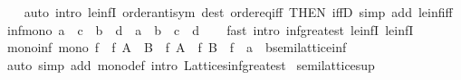 \begin{isabellebody}
%
\isadelimproof
\ \ %
\endisadelimproof
%
\isatagproof
{}\isamarkupfalse%
\ {\isacharparenleft}{\kern0pt}auto\ intro{\isacharcolon}{\kern0pt}\ le{\isacharunderscore}{\kern0pt}infI{}\ order{\isachardot}{\kern0pt}antisym\ dest{\isacharcolon}{\kern0pt}\ order{\isachardot}{\kern0pt}eq{\isacharunderscore}{\kern0pt}iff\ {\isacharbrackleft}{\kern0pt}THEN\ iffD{}{\isacharbrackright}{\kern0pt}\ simp\ add{\isacharcolon}{\kern0pt}\ le{\isacharunderscore}{\kern0pt}inf{\isacharunderscore}{\kern0pt}iff{\isacharparenright}{\kern0pt}%
\endisatagproof
{\isafoldproof}%
%
\isadelimproof
\isanewline
%
\endisadelimproof
\isanewline
{}\isamarkupfalse%
\ inf{\isacharunderscore}{\kern0pt}mono{\isacharcolon}{\kern0pt}\ {\isachardoublequoteopen}a\ {\isasymle}\ c\ {\isasymLongrightarrow}\ b\ {\isasymle}\ d\ {\isasymLongrightarrow}\ a\ {\isasymsqinter}\ b\ {\isasymle}\ c\ {\isasymsqinter}\ d{\isachardoublequoteclose}\isanewline
%
\isadelimproof
\ \ %
\endisadelimproof
%
\isatagproof
{}\isamarkupfalse%
\ {\isacharparenleft}{\kern0pt}fast\ intro{\isacharcolon}{\kern0pt}\ inf{\isacharunderscore}{\kern0pt}greatest\ le{\isacharunderscore}{\kern0pt}infI{}\ le{\isacharunderscore}{\kern0pt}infI{}{\isacharparenright}{\kern0pt}%
\endisatagproof
{\isafoldproof}%
%
\isadelimproof
\isanewline
%
\endisadelimproof
\isanewline
{}\isamarkupfalse%
\ mono{\isacharunderscore}{\kern0pt}inf{\isacharcolon}{\kern0pt}\ {\isachardoublequoteopen}mono\ f\ {\isasymLongrightarrow}\ f\ {\isacharparenleft}{\kern0pt}A\ {\isasymsqinter}\ B{\isacharparenright}{\kern0pt}\ {\isasymle}\ f\ A\ {\isasymsqinter}\ f\ B{\isachardoublequoteclose}\ \ f\ {\isacharcolon}{\kern0pt}{\isacharcolon}{\kern0pt}\ {\isachardoublequoteopen}{\isacharprime}{\kern0pt}a\ {\isasymRightarrow}\ {\isacharprime}{\kern0pt}b{\isacharcolon}{\kern0pt}{\isacharcolon}{\kern0pt}semilattice{\isacharunderscore}{\kern0pt}inf{\isachardoublequoteclose}\isanewline
%
\isadelimproof
\ \ %
\endisadelimproof
%
\isatagproof
{}\isamarkupfalse%
\ {\isacharparenleft}{\kern0pt}auto\ simp\ add{\isacharcolon}{\kern0pt}\ mono{\isacharunderscore}{\kern0pt}def\ intro{\isacharcolon}{\kern0pt}\ Lattices{\isachardot}{\kern0pt}inf{\isacharunderscore}{\kern0pt}greatest{\isacharparenright}{\kern0pt}%
\endisatagproof
{\isafoldproof}%
%
\isadelimproof
\isanewline
%
\endisadelimproof
\isanewline
{}\isamarkupfalse%
\isanewline
\isanewline
{}\isamarkupfalse%
\ semilattice{\isacharunderscore}{\kern0pt}sup\isanewline
{}\isanewline

\end{isabellebody}
